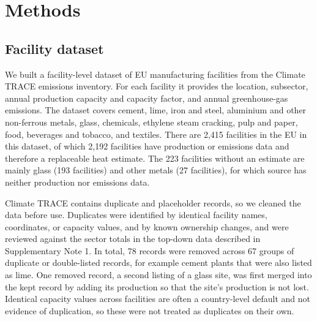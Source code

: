 \documentclass[11pt]{article}
\begin{document}
\section*{Methods}

\subsection*{Facility dataset}
We built a facility-level dataset of EU manufacturing facilities from the Climate TRACE emissions inventory\cite{climatetrace2026}. For each facility it provides the location, subsector, annual production capacity and capacity factor, and annual greenhouse-gas emissions. The dataset covers cement, lime, iron and steel, aluminium and other non-ferrous metals, glass, chemicals, ethylene steam cracking, pulp and paper, food, beverages and tobacco, and textiles. There are 2,415 facilities in the EU in this dataset, of which 2,192 facilities have production or emissions data and therefore a replaceable heat estimate. The 223 facilities without an estimate are mainly glass (193 facilities) and other metals (27 facilities), for which source has neither production nor emissions data.

Climate TRACE contains duplicate and placeholder records, so we cleaned the data before use. Duplicates were identified by identical facility names, coordinates, or capacity values, and by known ownership changes, and were reviewed against the sector totals in the top-down data described in Supplementary Note 1. In total, 78 records were removed across 67 groups of duplicate or double-listed records, for example cement plants that were also listed as lime. One removed record, a second listing of a glass site, was first merged into the kept record by adding its production so that the site's production is not lost. Identical capacity values across facilities are often a country-level default and not evidence of duplication, so these were not treated as duplicates on their own.
\end{document}
